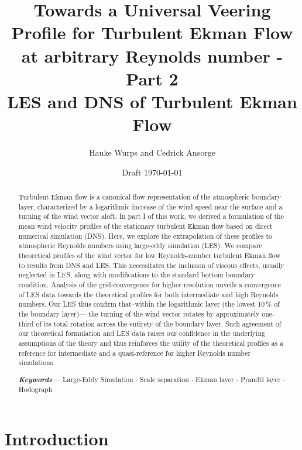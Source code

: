 \documentclass[a4paper,11pt]{article}
\author{Hauke Wurps and Cedrick Ansorge}
\date{Draft \today}
\title{Towards a Universal Veering Profile for Turbulent Ekman Flow at arbitrary Reynolds number - Part 2\\
  \normalsize LES and DNS of Turbulent Ekman Flow \\}
\providecommand{\keywords}[1]
{
  \small	
  \textbf{\textit{Keywords---}} #1
}
\begin{document}
 

\maketitle

\begin{abstract}
  Turbulent Ekman flow is a canonical flow representation of the atmospheric boundary layer, characterized by a logarithmic increase of the wind speed near the surface and a turning of the wind vector aloft. In part I of this work, we derived a formulation of the mean wind velocity profiles of the stationary turbulent Ekman flow based on direct numerical simulation (DNS). Here, we explore the extrapolation of these profiles to atmospheric Reynolds numbers using large-eddy simulation (LES).
  We compare theoretical profiles of the wind vector for low Reynolds-number turbulent Ekman flow to results from DNS and LES. This necessitates the inclusion of viscous effects, usually neglected in LES, along with modifications to the standard bottom boundary condition.
  Analysis of the grid-convergence for higher resolution unveils a convergence of LES data towards the theoretical profiles for both intermediate and high Reynolds numbers. Our LES thus confirm that--within the logarithmic layer (the lowest 10\,\% of the boundary layer)--- the turning of the wind vector rotates by approximately one-third of its total rotation across the entirety of the boundary layer.
  Such agreement of our theoretical formulation and LES data raises our confidence in the underlying assumptions of the theory and thus reinforces the utility of the theoretical profiles as a reference for intermediate and a quasi-reference for higher Reynolds number simulations.
%


\keywords{Large-Eddy Simulation $\cdot$ Scale separation $\cdot$ Ekman layer $\cdot$ Prandtl layer $\cdot$ Hodograph}
\end{abstract}
%
%
\section{Introduction}
\end{document}
